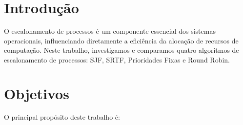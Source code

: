 \documentclass[
	12pt,				%
	openright,			%
	oneside,			%
	a4paper,			%
	chapter=TITLE,		%
	english,			%
	french,				%
	spanish,			%
	brazil				%
	]{abntex2}
\theoremstyle{definition}
\begin{document}
\frenchspacing 

\imprimircapa


\imprimirfolhaderosto

\newpage

\setlength{\absparsep}{18pt} %

\tableofcontents*
\cleardoublepage
\textual


\chapter{Introdução}

O escalonamento de processos é um componente essencial dos sistemas operacionais, 
influenciando diretamente a eficiência da alocação de recursos de computação. 
Neste trabalho, investigamos e comparamos quatro algoritmos de escalonamento de 
processos: SJF, SRTF, Prioridades Fixas e Round Robin.

\chapter{Objetivos}

O principal propósito deste trabalho é:
\end{document}

